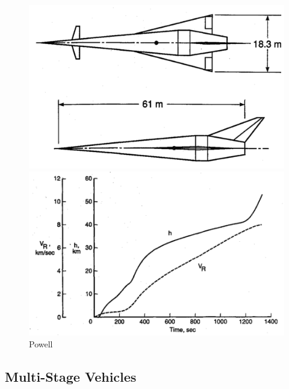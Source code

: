 \begin{figure}[h]
	\centering
	\begin{minipage}[b]{0.3\textwidth}
		\centering
		\includegraphics[width=\linewidth]{"figures/2_literature-review/Powell Vehicle"}
		\caption{}
		\label{fig:PowellVehicle}
	\end{minipage}	
	\begin{minipage}[b]{0.6\textwidth}
		\includegraphics[width=\linewidth]{"figures/2_literature-review/Powell Trajectory"}
		\caption{Powell}
		\label{fig:PowellTrajectory}
	\end{minipage}
	
\end{figure}
 
 \subsection{Multi-Stage Vehicles}

